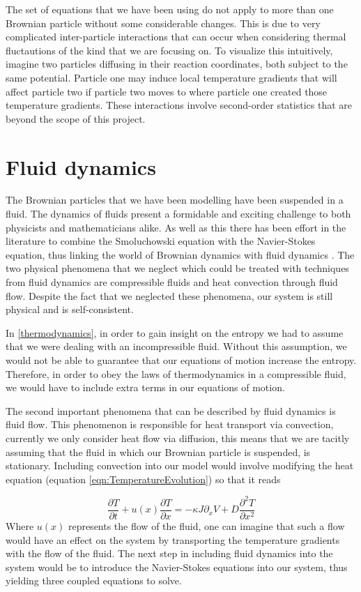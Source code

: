 The set of equations that we have been using do not apply to more than one Brownian particle without some considerable changes. This is due to very complicated inter-particle interactions that can occur when considering thermal fluctautions of the kind that we are focusing on. To visualize this intuitively, imagine two particles diffusing in their reaction coordinates, both subject to the same potential. Particle one may induce local temperature gradients that will affect particle two if particle two moves to where particle one created those temperature gradients. These interactions involve second-order statistics that are beyond the scope of this project.

\section{Fluid dynamics} \label{fluidDynamics}
The Brownian particles that we have been modelling have been suspended in a fluid. The dynamics of fluids present a formidable and exciting challenge to both physicists and mathematicians alike. As well as this there has been effort in the literature to combine the Smoluchowski equation with the Navier-Stokes equation, thus linking the world of Brownian dynamics with fluid dynamics \cite{Constantin2007}. The two physical phenomena that we neglect which could be treated with techniques from fluid dynamics are compressible fluids and heat convection through fluid flow. Despite the fact that we neglected these phenomena, our system is still physical and is self-consistent.

In \autoref{thermodynamics}, in order to gain insight on the entropy we had to assume that we were dealing with an incompressible fluid. Without this assumption, we would not be able to guarantee that our equations of motion
increase the entropy. Therefore, in order to obey the laws of thermodynamics in a compressible fluid, we would have to include extra terms in our equations of motion.

The second important phenomena that can be described by fluid dynamics is fluid flow. This phenomenon is responsible for heat transport via convection, currently we only consider heat flow via diffusion, this means that we are tacitly assuming that the fluid in which our Brownian particle is suspended, is stationary. Including convection into our model would involve modifying the heat equation (equation \ref{eqn:TemperatureEvolution}) so that it reads

\begin{equation}
\frac{\partial T}{\partial t} + u(x) \frac{\partial T}{\partial x} = -\kappa J \partial_x V + D \frac{\partial^2 T}{\partial x^2} 
\end{equation}
Where $u(x)$ represents the flow of the fluid, one can imagine that such a flow would have an effect on the system by transporting the temperature gradients with the flow of the fluid. The next step in including fluid dynamics into the system would be to introduce the Navier-Stokes equations into our system, thus yielding three coupled equations to solve.

